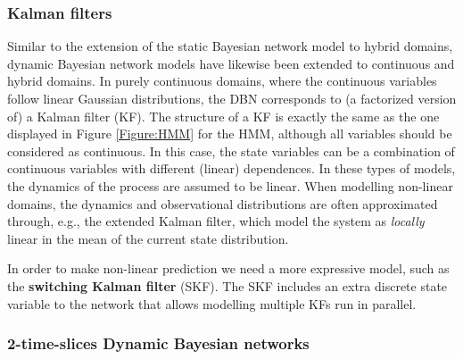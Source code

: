 \subsubsection{Kalman filters}
Similar to the extension of the static Bayesian network model to hybrid domains, dynamic Bayesian network models have likewise been extended to continuous and hybrid domains. In purely continuous domains, where the continuous variables follow linear Gaussian distributions, the DBN corresponds to (a factorized version of) a Kalman filter (KF). The structure of a KF is exactly the same as the one displayed in Figure \ref{Figure:HMM} for the HMM, although all variables should be considered as continuous. In this case, the state variables can be a combination of continuous variables with different (linear) dependences. In these types of models, the dynamics of the process are assumed to be linear. When modelling non-linear domains, the dynamics and observational distributions are often approximated through, e.g., the extended Kalman filter, which model the system as \textit{locally} linear in the mean of the current state distribution. 

In order to make non-linear prediction we need a more expressive model, such as the \textbf{switching Kalman filter} (SKF). The SKF includes an extra discrete state variable to the network that allows modelling multiple KFs run in parallel. 

\subsubsection{2-time-slices Dynamic Bayesian networks}	

